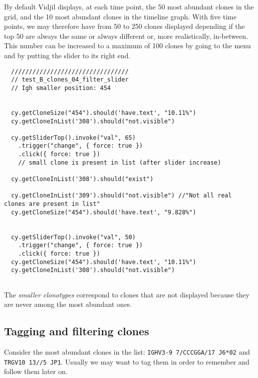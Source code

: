 By default Vidjil displays, at each time point, the 50 most abundant clones in the grid, and the 10 most abundant clones in the timeline graph.
With five time points, we may therefore have from 50 to 250 clones displayed
depending if the top 50 are always the same or always different or, more
realistically, in-between.
This number can be increased to a maximum of 100 clones by going to the  menu and by putting the
slider to its right end.

\begin{verbatim}
  /////////////////////////////////
  // test_B_clones_04_filter_slider
  // Igh smaller position: 454


  cy.getCloneSize("454").should('have.text', "10.11%")
  cy.getCloneInList('308').should("not.visible")

  cy.getSliderTop().invoke("val", 65)
    .trigger("change", { force: true })
    .click({ force: true })
    // small clone is present in list (after slider increase)

  cy.getCloneInList('308').should("exist")

  cy.getCloneInList('309').should("not.visible") //"Not all real clones are present in list"
  cy.getCloneSize("454").should('have.text', "9.828%")


  cy.getSliderTop().invoke("val", 50)
    .trigger("change", { force: true })
    .click({ force: true })
  cy.getCloneSize("454").should('have.text', "10.11%")
  cy.getCloneInList('308').should("not.visible")


\end{verbatim}

The \textit{smaller clonotypes} correspond to clones that are not displayed
because they are never among the most abundant ones.


\subsection{Tagging and filtering clones}

Consider the most abundant clones in the list:  \texttt{IGHV3-9 7/CCCGGA/17 J6*02} and  \texttt{TRGV10 13//5 JP1}.
Usually we may want to tag them in order to remember and follow them later on.

